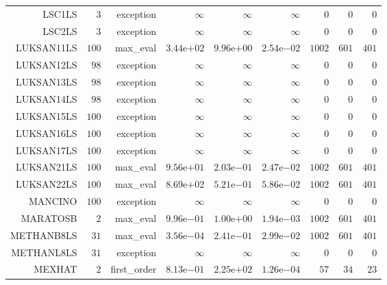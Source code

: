 \begin{longtable}{rrrrrrrrr}
LSC1LS & \(     3\) & exception & \(\infty\) & \(\infty\) & \(\infty\) & \(     0\) & \(     0\) & \(     0\) \\
LSC2LS & \(     3\) & exception & \(\infty\) & \(\infty\) & \(\infty\) & \(     0\) & \(     0\) & \(     0\) \\
LUKSAN11LS & \(   100\) & max\_eval & \( 3.44\)e\(+02\) & \( 9.96\)e\(+00\) & \( 2.54\)e\(-02\) & \(  1002\) & \(   601\) & \(   401\) \\
LUKSAN12LS & \(    98\) & exception & \(\infty\) & \(\infty\) & \(\infty\) & \(     0\) & \(     0\) & \(     0\) \\
LUKSAN13LS & \(    98\) & exception & \(\infty\) & \(\infty\) & \(\infty\) & \(     0\) & \(     0\) & \(     0\) \\
LUKSAN14LS & \(    98\) & exception & \(\infty\) & \(\infty\) & \(\infty\) & \(     0\) & \(     0\) & \(     0\) \\
LUKSAN15LS & \(   100\) & exception & \(\infty\) & \(\infty\) & \(\infty\) & \(     0\) & \(     0\) & \(     0\) \\
LUKSAN16LS & \(   100\) & exception & \(\infty\) & \(\infty\) & \(\infty\) & \(     0\) & \(     0\) & \(     0\) \\
LUKSAN17LS & \(   100\) & exception & \(\infty\) & \(\infty\) & \(\infty\) & \(     0\) & \(     0\) & \(     0\) \\
LUKSAN21LS & \(   100\) & max\_eval & \( 9.56\)e\(+01\) & \( 2.03\)e\(-01\) & \( 2.47\)e\(-02\) & \(  1002\) & \(   601\) & \(   401\) \\
LUKSAN22LS & \(   100\) & max\_eval & \( 8.69\)e\(+02\) & \( 5.21\)e\(-01\) & \( 5.86\)e\(-02\) & \(  1002\) & \(   601\) & \(   401\) \\
MANCINO & \(   100\) & exception & \(\infty\) & \(\infty\) & \(\infty\) & \(     0\) & \(     0\) & \(     0\) \\
MARATOSB & \(     2\) & max\_eval & \( 9.96\)e\(-01\) & \( 1.00\)e\(+00\) & \( 1.94\)e\(-03\) & \(  1002\) & \(   601\) & \(   401\) \\
METHANB8LS & \(    31\) & max\_eval & \( 3.56\)e\(-04\) & \( 2.41\)e\(-01\) & \( 2.99\)e\(-02\) & \(  1002\) & \(   601\) & \(   401\) \\
METHANL8LS & \(    31\) & exception & \(\infty\) & \(\infty\) & \(\infty\) & \(     0\) & \(     0\) & \(     0\) \\
MEXHAT & \(     2\) & first\_order & \( 8.13\)e\(-01\) & \( 2.25\)e\(+02\) & \( 1.26\)e\(-04\) & \(    57\) & \(    34\) & \(    23\) \\

\end{longtable}
